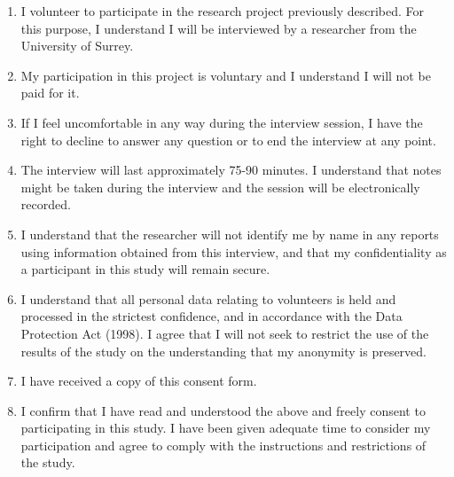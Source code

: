 \begin{enumerate}
	\item I volunteer to participate in the research project previously described. For this purpose, I understand I will be interviewed by a researcher from the University of Surrey. 
	\item My participation in this project is voluntary and I understand I will not be paid for it.
	\item If I feel uncomfortable in any way during the interview session, I have the right to decline to answer any question or to end the interview at any point. 
	\item The interview will last approximately 75-90 minutes. I understand that notes might be taken during the interview and the session will be electronically recorded.
	\item I understand that the researcher will not identify me by name in any reports using information obtained from this interview, and that my confidentiality as a participant in this study will remain secure.
	\item I understand that all personal data relating to volunteers is held and processed in the strictest confidence, and in accordance with the Data Protection Act (1998). I agree that I will not seek to restrict the use of the results of the study on the understanding that my anonymity is preserved.
	\item I have received a copy of this consent form.
	\item I confirm that I have read and understood the above and freely consent to participating in this study. I have been given adequate time to consider my participation and agree to comply with the instructions and restrictions of the study.
\end{enumerate}


\vspace{.6in}
\vspace{.6in}
